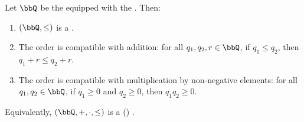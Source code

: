 \begin{proposition} \label{proposition:rational_numbers_form_ordered_field}
    Let $\bbQ$ be the  equipped with the . Then:
    \begin{enumerate}
        \item $(\bbQ, \le)$ is a .
        \item The order is compatible with addition: for all $q_1,q_2,r \in \bbQ$, if $q_1 \le q_2$, then $q_1 + r \le q_2 + r$.
        \item The order is compatible with multiplication by non-negative elements: for all $q_1,q_2 \in \bbQ$, if $q_1 \ge 0$ and $q_2 \ge 0$, then $q_1 q_2 \ge 0$.
    \end{enumerate}
    Equivalently, $(\bbQ, +, \cdot, \le)$ is a () .
\end{proposition}

